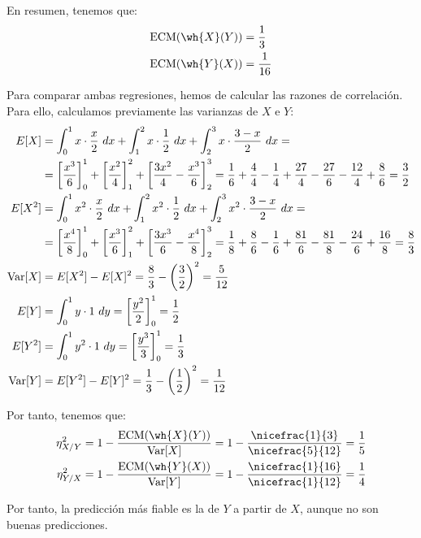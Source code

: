 \begin{ejercicio}
    En resumen, tenemos que:
    \begin{align*}
        \text{ECM}(\wh{X}(Y)) &= \dfrac{1}{3}\\
        \text{ECM}(\wh{Y}(X)) &= \dfrac{1}{16}
    \end{align*}

    Para comparar ambas regresiones, hemos de calcular las razones de correlación. Para ello, calculamos previamente las varianzas de $X$ e $Y$:
    \begin{align*}
        E[X] &= \int_{0}^{1} x\cdot \frac{x}{2} \ dx + \int_{1}^{2} x\cdot \frac{1}{2} \ dx + \int_{2}^{3} x\cdot \frac{3-x}{2} \ dx
        =\\&= \left[\frac{x^3}{6}\right]_{0}^{1} + \left[\frac{x^2}{4}\right]_{1}^{2} + \left[\frac{3x^2}{4}-\frac{x^3}{6}\right]_{2}^{3} 
        = \frac{1}{6} + \frac{4}{4} - \frac{1}{4} + \frac{27}{4} - \frac{27}{6} - \frac{12}{4} + \frac{8}{6}
        = \frac{3}{2}\\
        E[X^2] &= \int_{0}^{1} x^2\cdot \frac{x}{2} \ dx + \int_{1}^{2} x^2\cdot \frac{1}{2} \ dx + \int_{2}^{3} x^2\cdot \frac{3-x}{2} \ dx
        =\\&= \left[\frac{x^4}{8}\right]_{0}^{1} + \left[\frac{x^3}{6}\right]_{1}^{2} + \left[\frac{3x^3}{6}-\frac{x^4}{8}\right]_{2}^{3}
        = \frac{1}{8} + \frac{8}{6} - \frac{1}{6} + \frac{81}{6} - \frac{81}{8} - \frac{24}{6} + \frac{16}{8} = \frac{8}{3}\\
        \operatorname{Var}[X] &= E[X^2]-E[X]^2 = \frac{8}{3}-\left(\frac{3}{2}\right)^2 = \frac{5}{12}\\
        E[Y] &= \int_{0}^{1} y\cdot 1 \ dy = \left[\frac{y^2}{2}\right]_{0}^{1} = \frac{1}{2}\\
        E[Y^2] &= \int_{0}^{1} y^2\cdot 1 \ dy = \left[\frac{y^3}{3}\right]_{0}^{1} = \frac{1}{3}\\
        \operatorname{Var}[Y] &= E[Y^2]-E[Y]^2 = \frac{1}{3}-\left(\frac{1}{2}\right)^2 = \frac{1}{12}
    \end{align*}

    Por tanto, tenemos que:
    \begin{align*}
        \eta_{X/Y}^2 &= 1-\frac{\text{ECM}(\wh{X}(Y))}{\Var[X]} = 1-\frac{\nicefrac{1}{3}}{\nicefrac{5}{12}} = \frac{1}{5}\\
        \eta_{Y/X}^2 &= 1-\frac{\text{ECM}(\wh{Y}(X))}{\Var[Y]} = 1-\frac{\nicefrac{1}{16}}{\nicefrac{1}{12}} = \frac{1}{4}
    \end{align*}

    Por tanto, la predicción más fiable es la de $Y$ a partir de $X$, aunque no son buenas predicciones.
\end{ejercicio}

